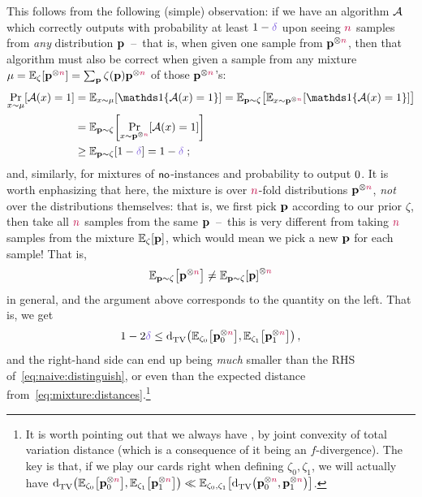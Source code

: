 This follows from the following (simple) observation: if we have an algorithm $\mathcal{A}$ which correctly outputs \accept with probability at least $1-\errprob$ upon seeing ${\textcolor{purple}{n}}$ samples from \emph{any} distribution $\mathbf{p}$~--~that is, when given one sample from $\mathbf{p}^{\otimes{\textcolor{purple}{n}}}$, then that algorithm must also be correct when given a sample from any mixture $\mu = \bE{\zeta}{\p^{\otimes\ns}}=\sum_{\p}\zeta(\p)\p^{\otimes\ns}$ of those $\mathbf{p}^{\otimes{\textcolor{purple}{n}}}$'s:
\begin{align*}
	\bP{x\sim\mu}{\Algo(x)=\accept}
	&= \bE{x\sim\mu}{\indic{\Algo(x)=\accept}}
	= \bE{\p\sim\zeta}{\bE{x\sim\p^{\otimes\ns}}{\indic{\Algo(x)=\accept}}}\\
	&= \bE{\p\sim\zeta}{\bP{x\sim\p^{\otimes\ns}}{\Algo(x)=\accept}}\\
	&\geq \bE{\p\sim\zeta}{1-\errprob} = 1-\errprob\;;
\end{align*}
and, similarly, for mixtures of ${\sf{}no}$-instances and probability to output $0$. It is worth enphasizing that here, the mixture is over ${\textcolor{purple}{n}}$-fold distributions $\mathbf{p}^{\otimes{\textcolor{purple}{n}}}$, \emph{not} over the distributions themselves: that is, we first pick $\mathbf{p}$ according to our prior $\zeta$, then take all ${\textcolor{purple}{n}}$ samples from the same $\mathbf{p}$~--~this is very different from taking ${\textcolor{purple}{n}}$ samples from the mixture $\bE{\zeta}{\p}$, which would mean we pick a new $\mathbf{p}$ for each sample! That is,
\begin{equation}
	\bE{\p\sim\zeta}{\p^{\otimes\ns}} \neq \bE{\p\sim\zeta}{\p}^{\otimes\ns}
\end{equation}
in general, and the argument above corresponds to the quantity on the left. That is, we get
\begin{equation}
	\label{eq:lecam}
	1-2\errprob \leq \totalvardist{\bE{\zeta_\reject}{\p_\reject^{\otimes\ns}}}{\bE{\zeta_\accept}{\p_\accept^{\otimes\ns}}}\,,
\end{equation}
and the right-hand side can end up being \emph{much} smaller than the RHS of~\cref{eq:naive:distinguish}, or even than the expected distance from~\cref{eq:mixture:distances}.\footnote{It is worth pointing out that we always have , by joint convexity of total variation distance (which is a consequence of it being an $f$-divergence). The key is that, if we play our cards right when defining $\zeta_0,\zeta_1$, we will actually have
$\totalvardist{\bE{\zeta_\reject}{\p_\reject^{\otimes\ns}}}{\bE{\zeta_\accept}{\p_\accept^{\otimes\ns}}} \ll \bE{\zeta_\reject,\zeta_\accept}{\totalvardist{\p_0^{\otimes\ns}}{\p_1^{\otimes\ns}}}$.}

